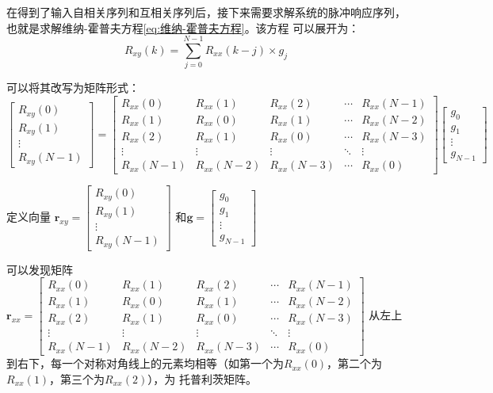 在得到了输入自相关序列和互相关序列后，接下来需要求解系统的脉冲响应序列，也就是求解维纳-霍普夫方程\ref{eq:维纳-霍普夫方程}。该方程
可以展开为：
\begin{equation*}
    R_{xy}(k)=\sum_{j=0}^{N-1}R_{xx}(k-j)\times g_j
\end{equation*}

可以将其改写为矩阵形式：
\begin{equation*}
    \begin{bmatrix}
        R_{xy}(0)\\
        R_{xy}(1)\\
        \vdots\\
        R_{xy}(N-1)
    \end{bmatrix}
    =
    \begin{bmatrix}
        R_{xx}(0)&R_{xx}(1)&R_{xx}(2)&\cdots&R_{xx}(N-1)\\
        R_{xx}(1)&R_{xx}(0)&R_{xx}(1)&\cdots&R_{xx}(N-2)\\
        R_{xx}(2)&R_{xx}(1)&R_{xx}(0)&\cdots&R_{xx}(N-3)\\
        \vdots&\vdots&\vdots&\ddots&\vdots\\
        R_{xx}(N-1)&R_{xx}(N-2)&R_{xx}(N-3)&\cdots&R_{xx}(0)
    \end{bmatrix}
    \begin{bmatrix}
        g_0\\
        g_1\\
        \vdots\\
        g_{N-1}
       \end{bmatrix}
\end{equation*}

定义向量
\(\bm{r}_{xy}=\begin{bmatrix}
        R_{xy}(0)\\
        R_{xy}(1)\\
        \vdots\\
        R_{xy}(N-1)
    \end{bmatrix}\)
和\(\bm{g}=\begin{bmatrix}
        g_0\\
        g_1\\
        \vdots\\
        g_{N-1}
    \end{bmatrix}\)

可以发现矩阵
\(\bm{r}_{xx}=
    \begin{bmatrix}
        R_{xx}(0)&R_{xx}(1)&R_{xx}(2)&\cdots&R_{xx}(N-1)\\
        R_{xx}(1)&R_{xx}(0)&R_{xx}(1)&\cdots&R_{xx}(N-2)\\
        R_{xx}(2)&R_{xx}(1)&R_{xx}(0)&\cdots&R_{xx}(N-3)\\
        \vdots&\vdots&\vdots&\ddots&\vdots\\
        R_{xx}(N-1)&R_{xx}(N-2)&R_{xx}(N-3)&\cdots&R_{xx}(0)
    \end{bmatrix}
    \)
从左上到右下，每一个对称对角线上的元素均相等（如第一个为\(R_{xx}(0)\)，第二个为\(R_{xx}(1)\)，第三个为\(R_{xx}(2)\)），为
托普利茨矩阵。

